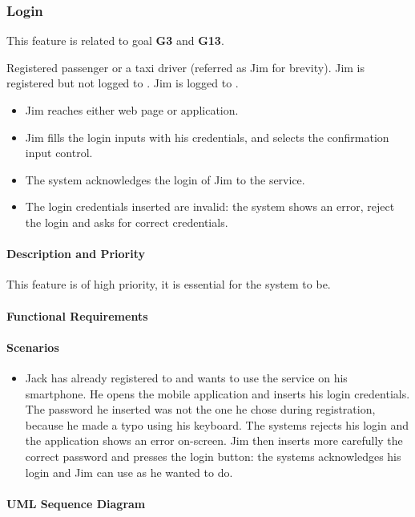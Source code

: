 \subsubsection{Login}
This feature is related to goal \textbf{G3} and \textbf{G13}.
\begin{itemize}
	 Registered passenger or a taxi driver (referred as Jim for brevity).
	 Jim is registered but not logged to \myTaxiService{}.
	 Jim is logged to \myTaxiService{}.
	\begin{itemize}
		\item Jim reaches either \myTaxiService{} web page or application.
		\item Jim fills the login inputs with his credentials, and selects the confirmation input control.
		\item The system acknowledges the login of Jim to the service.
	\end{itemize}
	\begin{itemize}
		\item The login credentials inserted are invalid: the system shows an error, reject the login and asks for correct credentials.
	\end{itemize}
\end{itemize}
\paragraph{Description and Priority}
This feature is of high priority, it is essential for the system to be.\par
\paragraph{Functional Requirements}
\begin{itemize}
\end{itemize}
\paragraph{Scenarios}
\begin{itemize}
	\item Jack has already registered to \myTaxiService{} and wants to use the service on his smartphone.
	He opens the mobile application and inserts his login credentials.
	The password he inserted was not the one he chose during registration, because he made a typo using his keyboard.
	The systems rejects his login and the application shows an error on-screen.
	Jim then inserts more carefully the correct password and presses the login button: the systems acknowledges his login and Jim can use \myTaxiService{} as he wanted to do.
\end{itemize}
\paragraph{UML Sequence Diagram}
